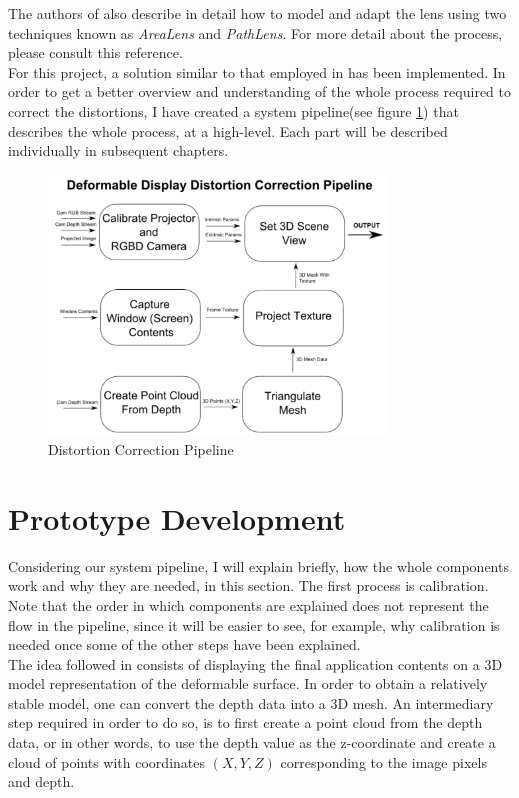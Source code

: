 \documentclass[]{article}
\begin{document}
The authors of \cite{pindat12} also describe in detail how to model and adapt the lens using two techniques known as \textit{AreaLens} and \textit{PathLens}. For more detail about the process, please consult this reference.\\

For this project, a solution similar to that employed in \cite{watanabe08} has been implemented. In order to get a better overview and understanding of the whole process required to correct the distortions, I have created a system pipeline(see figure \ref{fig:Pipeline}) that describes the whole process, at a high-level. Each part will be described individually in subsequent chapters.

\begin{figure}[hbtp]
    \centering
    \includegraphics[width=0.8\textwidth]{figures/DeformableDisplayPipeline.PNG}
    \caption{Distortion Correction Pipeline}
    \label{fig:Pipeline}
\end{figure}

\section{Prototype Development}

Considering our system pipeline, I will explain briefly, how the whole components work and why they are needed, in this section. The first process is calibration. Note that the order in which components are explained does not represent the flow in the pipeline, since it will be easier to see, for example, why calibration is needed once some of the other steps have been explained.\\

The idea followed in \cite{watanabe08} consists of displaying the final application contents on a 3D model representation of the deformable surface. In order to obtain a relatively stable model, one can convert the depth data into a 3D mesh. An intermediary step required in order to do so, is to first create a point cloud from the depth data, or in other words, to use the depth value as the z-coordinate and create a cloud of points with coordinates $(X, Y, Z)$ corresponding to the image pixels and depth.\\
\end{document}
